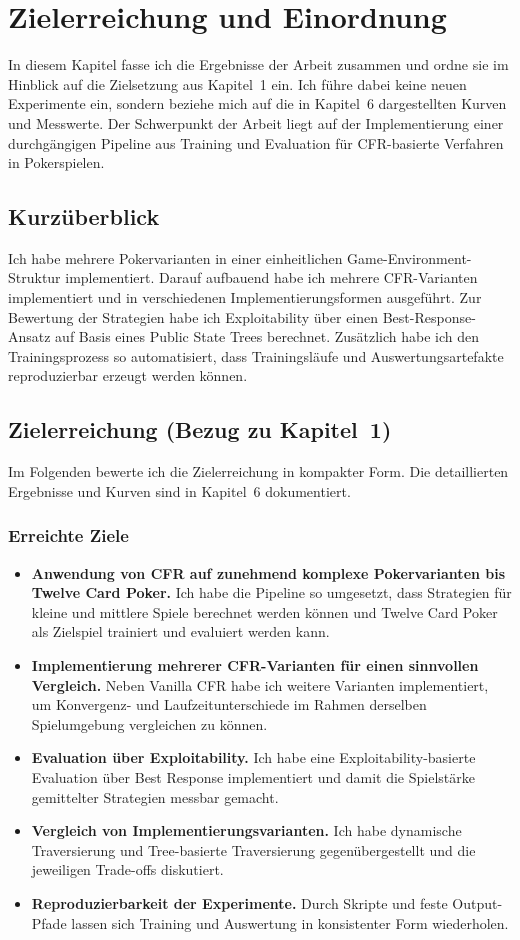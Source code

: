 \section{Zielerreichung und Einordnung}
In diesem Kapitel fasse ich die Ergebnisse der Arbeit zusammen und ordne sie im Hinblick auf die Zielsetzung aus Kapitel~1 ein.
Ich führe dabei keine neuen Experimente ein, sondern beziehe mich auf die in Kapitel~6 dargestellten Kurven und Messwerte.
Der Schwerpunkt der Arbeit liegt auf der Implementierung einer durchgängigen Pipeline aus Training und Evaluation für CFR-basierte Verfahren in Pokerspielen.

\subsection{Kurzüberblick}
Ich habe mehrere Pokervarianten in einer einheitlichen Game-Environment-Struktur implementiert.
Darauf aufbauend habe ich mehrere CFR-Varianten implementiert und in verschiedenen Implementierungsformen ausgeführt.
Zur Bewertung der Strategien habe ich Exploitability über einen Best-Response-Ansatz auf Basis eines Public State Trees berechnet.
Zusätzlich habe ich den Trainingsprozess so automatisiert, dass Trainingsläufe und Auswertungsartefakte reproduzierbar erzeugt werden können.

\subsection{Zielerreichung (Bezug zu Kapitel~1)}
Im Folgenden bewerte ich die Zielerreichung in kompakter Form.
Die detaillierten Ergebnisse und Kurven sind in Kapitel~6 dokumentiert.

\subsubsection{Erreichte Ziele}
\begin{itemize}
\item \textbf{Anwendung von CFR auf zunehmend komplexe Pokervarianten bis Twelve Card Poker.}
Ich habe die Pipeline so umgesetzt, dass Strategien für kleine und mittlere Spiele berechnet werden können und Twelve Card Poker als Zielspiel trainiert und evaluiert werden kann.
\item \textbf{Implementierung mehrerer CFR-Varianten für einen sinnvollen Vergleich.}
Neben Vanilla CFR habe ich weitere Varianten implementiert, um Konvergenz- und Laufzeitunterschiede im Rahmen derselben Spielumgebung vergleichen zu können.
\item \textbf{Evaluation über Exploitability.}
Ich habe eine Exploitability-basierte Evaluation über Best Response implementiert und damit die Spielstärke gemittelter Strategien messbar gemacht.
\item \textbf{Vergleich von Implementierungsvarianten.}
Ich habe dynamische Traversierung und Tree-basierte Traversierung gegenübergestellt und die jeweiligen Trade-offs diskutiert.
\item \textbf{Reproduzierbarkeit der Experimente.}
Durch Skripte und feste Output-Pfade lassen sich Training und Auswertung in konsistenter Form wiederholen.
\end{itemize}

